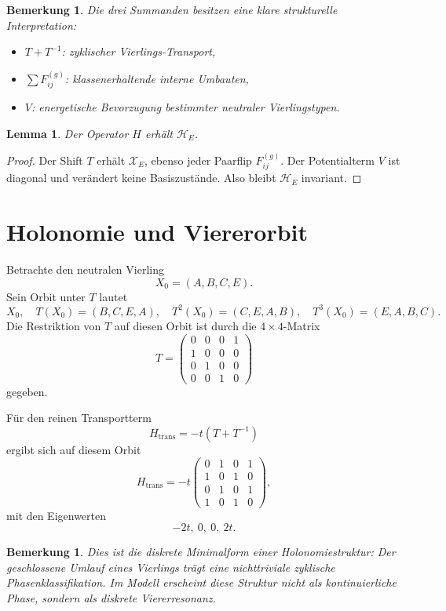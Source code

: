 \documentclass[11pt,a4paper]{article}
\newtheorem{lemma}[definition]{Lemma}
\newtheorem{remark}[definition]{Bemerkung}
\newcommand{\X}{\mathcal X}
\newcommand{\HE}{\mathcal H_E}
\begin{document}
	\begin{remark}
		Die drei Summanden besitzen eine klare strukturelle Interpretation:
		\begin{itemize}
			\item \(T+T^{-1}\): zyklischer Vierlings-Transport,
			\item \(\sum F_{ij}^{(g)}\): klassenerhaltende interne Umbauten,
			\item \(V\): energetische Bevorzugung bestimmter neutraler Vierlingstypen.
		\end{itemize}
	\end{remark}
	
	\begin{lemma}
		Der Operator \(H\) erhält \(\HE\).
	\end{lemma}
	
	\begin{proof}
		Der Shift \(T\) erhält \(\X_E\), ebenso jeder Paarflip \(F_{ij}^{(g)}\). Der Potentialterm \(V\) ist diagonal und verändert keine Basiszustände. Also bleibt \(\HE\) invariant.
	\end{proof}
	
	\section{Holonomie und Viererorbit}
	
	Betrachte den neutralen Vierling
	\[
	X_0=(A,B,C,E).
	\]
	Sein Orbit unter \(T\) lautet
	\[
	X_0,\quad T(X_0)=(B,C,E,A),\quad T^2(X_0)=(C,E,A,B),\quad T^3(X_0)=(E,A,B,C).
	\]
	Die Restriktion von \(T\) auf diesen Orbit ist durch die \(4\times 4\)-Matrix
	\[
	T=
	\begin{pmatrix}
		0&0&0&1\\
		1&0&0&0\\
		0&1&0&0\\
		0&0&1&0
	\end{pmatrix}
	\]
	gegeben.
	
	Für den reinen Transportterm
	\[
	H_{\mathrm{trans}}=-t(T+T^{-1})
	\]
	ergibt sich auf diesem Orbit
	\[
	H_{\mathrm{trans}}
	=
	-t
	\begin{pmatrix}
		0&1&0&1\\
		1&0&1&0\\
		0&1&0&1\\
		1&0&1&0
	\end{pmatrix},
	\]
	mit den Eigenwerten
	\[
	-2t,\ 0,\ 0,\ 2t.
	\]
	
	\begin{remark}
		Dies ist die diskrete Minimalform einer Holonomiestruktur: Der geschlossene Umlauf eines Vierlings trägt eine nichttriviale zyklische Phasenklassifikation. Im Modell erscheint diese Struktur nicht als kontinuierliche Phase, sondern als diskrete Viererresonanz.
	\end{remark}
	
\end{document}
